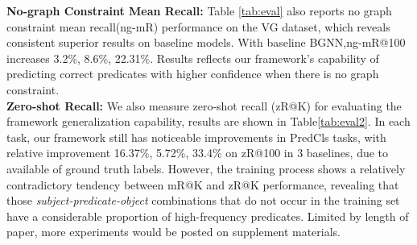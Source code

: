 \documentclass[runningheads]{llncs}
\begin{document}
\noindent\textbf{No-graph Constraint Mean Recall:}   Table \ref{tab:eval} also
reports no graph constraint mean recall(ng-mR) performance on the VG dataset,
which reveals consistent superior results on baseline models. With baseline
BGNN,ng-mR@100 increases  3.2\%, 8.6\%, 22.31\%.  Results reflects our
framework's capability of predicting correct predicates with higher confidence
when there is no graph constraint.\\

\noindent\textbf{Zero-shot Recall:} We also measure zero-shot recall (zR@K) for
evaluating the framework generalization capability, results are shown in
Table\ref{tab:eval2}. In each task, our framework still has noticeable
improvements in PredCls tasks, with relative improvement 16.37\%, 5.72\%,
33.4\% on zR@100 in 3 baselines, due to available of ground truth labels.
However, the training process shows a relatively contradictory tendency between
mR@K and zR@K performance, revealing that those
\textit{subject-predicate-object} combinations that do not occur in the
training set have a considerable proportion of high-frequency predicates.
Limited by length of paper, more  experiments would be posted on supplement
materials.
\end{document}
